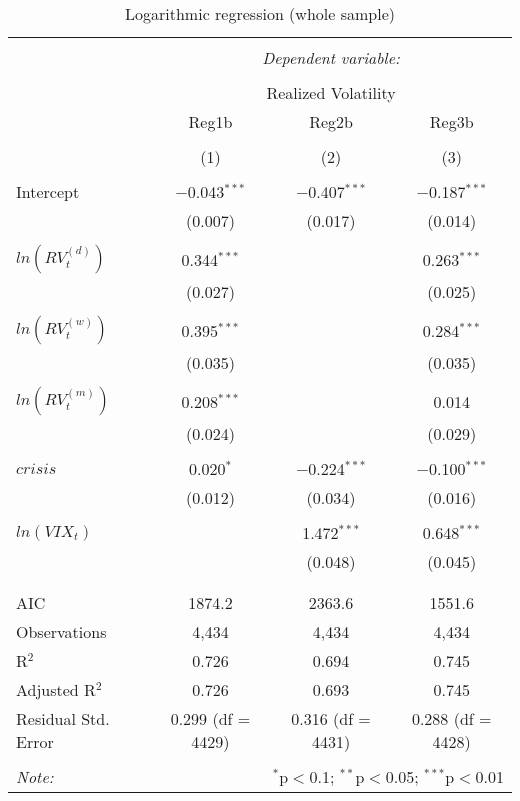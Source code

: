 
\begin{table}[!htbp] \centering 
  \caption{Logarithmic regression (whole sample)} 
  \label{newey2} 
\begin{tabular}{@{\extracolsep{5pt}}lccc} 
\\[-1.8ex]\hline 
\hline \\[-1.8ex] 
 & \multicolumn{3}{c}{\textit{Dependent variable:}} \\ 
\cline{2-4} 
\\[-1.8ex] & \multicolumn{3}{c}{Realized Volatility} \\ 
 & Reg1b & Reg2b & Reg3b \\ 
\\[-1.8ex] & (1) & (2) & (3)\\ 
\hline \\[-1.8ex] 
 Intercept & $-$0.043$^{***}$ & $-$0.407$^{***}$ & $-$0.187$^{***}$ \\ 
  & (0.007) & (0.017) & (0.014) \\ 
  & & & \\ 
 $ln(RV^{(d)}_{t})$ & 0.344$^{***}$ &  & 0.263$^{***}$ \\ 
  & (0.027) &  & (0.025) \\ 
  & & & \\ 
 $ln(RV^{(w)}_{t})$ & 0.395$^{***}$ &  & 0.284$^{***}$ \\ 
  & (0.035) &  & (0.035) \\ 
  & & & \\ 
 $ ln(RV^{(m)}_{t})$ & 0.208$^{***}$ &  & 0.014 \\ 
  & (0.024) &  & (0.029) \\ 
  & & & \\ 
 $crisis$ & 0.020$^{*}$ & $-$0.224$^{***}$ & $-$0.100$^{***}$ \\ 
  & (0.012) & (0.034) & (0.016) \\ 
  & & & \\ 
 $ln(VIX_{t})$ &  & 1.472$^{***}$ & 0.648$^{***}$ \\ 
  &  & (0.048) & (0.045) \\ 
  & & & \\ 
\hline \\[-1.8ex] 
AIC & 1874.2 & 2363.6 & 1551.6 \\ 
Observations & 4,434 & 4,434 & 4,434 \\ 
R$^{2}$ & 0.726 & 0.694 & 0.745 \\ 
Adjusted R$^{2}$ & 0.726 & 0.693 & 0.745 \\ 
Residual Std. Error & 0.299 (df = 4429) & 0.316 (df = 4431) & 0.288 (df = 4428) \\ 
\hline 
\hline \\[-1.8ex] 
\textit{Note:}  & \multicolumn{3}{r}{$^{*}$p$<$0.1; $^{**}$p$<$0.05; $^{***}$p$<$0.01} \\ 
\end{tabular} 
\end{table} 
